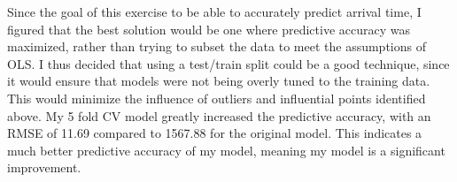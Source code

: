 \documentclass[
]{article}
\begin{document}
Since the goal of this exercise to be able to accurately predict arrival
time, I figured that the best solution would be one where predictive
accuracy was maximized, rather than trying to subset the data to meet
the assumptions of OLS. I thus decided that using a test/train split
could be a good technique, since it would ensure that models were not
being overly tuned to the training data. This would minimize the
influence of outliers and influential points identified above. My 5 fold
CV model greatly increased the predictive accuracy, with an RMSE of
11.69 compared to 1567.88 for the original model. This indicates a much
better predictive accuracy of my model, meaning my model is a
significant improvement.
\end{document}
